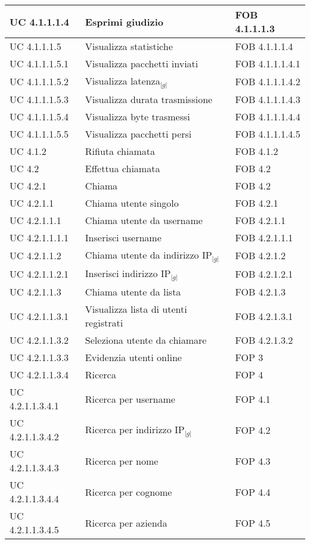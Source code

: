\begin{longtable}{p{} p{} p{} }
\midrule
UC 4.1.1.1.4 & Esprimi giudizio & FOB 4.1.1.1.3\\

\midrule
UC 4.1.1.1.5 & Visualizza statistiche & FOB 4.1.1.1.4\\
\midrule
UC 4.1.1.1.5.1 & Visualizza pacchetti inviati & FOB 4.1.1.1.4.1\\
\midrule
UC 4.1.1.1.5.2 & Visualizza latenza$_{|g|}$ & FOB 4.1.1.1.4.2\\
\midrule
UC 4.1.1.1.5.3 & Visualizza durata trasmissione & FOB 4.1.1.1.4.3\\
\midrule
UC 4.1.1.1.5.4 & Visualizza byte trasmessi & FOB 4.1.1.1.4.4\\
\midrule
UC 4.1.1.1.5.5 & Visualizza pacchetti persi & FOB 4.1.1.1.4.5\\

\midrule
UC 4.1.2 & Rifiuta chiamata & FOB 4.1.2\\

\midrule
UC 4.2 & Effettua chiamata & FOB 4.2\\

\midrule
UC 4.2.1 & Chiama & FOB 4.2\\

\midrule
UC 4.2.1.1 & Chiama utente singolo & FOB 4.2.1\\

\midrule
UC 4.2.1.1.1 & Chiama utente da username & FOB 4.2.1.1\\
\midrule
UC 4.2.1.1.1.1 & Inserisci username & FOB 4.2.1.1.1\\

\midrule
UC 4.2.1.1.2 & Chiama utente da indirizzo IP$_{|g|}$ & FOB 4.2.1.2\\
\midrule
UC 4.2.1.1.2.1 & Inserisci indirizzo IP$_{|g|}$ & FOB 4.2.1.2.1\\

\midrule
UC 4.2.1.1.3 & Chiama utente da lista & FOB 4.2.1.3\\
\midrule
UC 4.2.1.1.3.1 & Visualizza lista di utenti registrati & FOB 4.2.1.3.1\\
\midrule
UC 4.2.1.1.3.2 & Seleziona utente da chiamare & FOB 4.2.1.3.2\\
\midrule
UC 4.2.1.1.3.3 & Evidenzia utenti online & FOP 3\\
\midrule
UC 4.2.1.1.3.4 & Ricerca & FOP 4\\
\midrule
UC 4.2.1.1.3.4.1 & Ricerca per username & FOP 4.1\\
\midrule
UC 4.2.1.1.3.4.2 & Ricerca per indirizzo IP$_{|g|}$ & FOP 4.2\\
\midrule
UC 4.2.1.1.3.4.3 & Ricerca per nome & FOP 4.3\\
\midrule
UC 4.2.1.1.3.4.4 & Ricerca per cognome & FOP 4.4\\
\midrule
UC 4.2.1.1.3.4.5 & Ricerca per azienda & FOP 4.5\\



\end{longtable}
